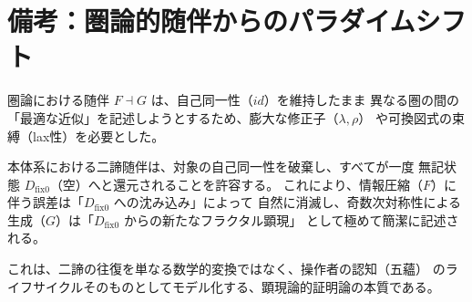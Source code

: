 \documentclass[11pt,a4paper]{article}
\theoremstyle{definition}
\newcommand{\dfix}{D_{\mathrm{fix}0}} %
\begin{document}
\section*{備考：圏論的随伴からのパラダイムシフト}

圏論における随伴 $F \dashv G$ は、自己同一性（$id$）を維持したまま
異なる圏の間の「最適な近似」を記述しようとするため、膨大な修正子（$\lambda, \rho$）
や可換図式の束縛（lax性）を必要とした。

本体系における二諦随伴は、対象の自己同一性を破棄し、すべてが一度
無記状態 $\dfix$（空）へと還元されることを許容する。
これにより、情報圧縮（$F$）に伴う誤差は「$\dfix$ への沈み込み」によって
自然に消滅し、奇数次対称性による生成（$G$）は「$\dfix$ からの新たなフラクタル顕現」
として極めて簡潔に記述される。

これは、二諦の往復を単なる数学的変換ではなく、操作者の認知（五蘊）
のライフサイクルそのものとしてモデル化する、顕現論的証明論の本質である。
\end{document}
